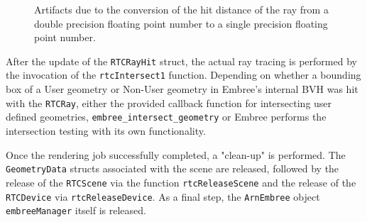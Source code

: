 \begin{figure}[!tbp]
	\centering
	\hfil
	\caption{Artifacts due to the conversion of the hit distance of the ray from a double precision floating point number to a single precision floating point number.}
	\label{fig:offset}
\end{figure}

After the update of the \texttt{RTCRayHit} struct, the actual ray tracing is performed by the invocation of the \texttt{rtcIntersect1} function. Depending on whether a bounding box of a User geometry or Non-User geometry in Embree's internal BVH was hit with the \texttt{RTCRay}, either the provided callback function for intersecting user defined geometries, \texttt{embree\_intersect\_geometry} or Embree performs the intersection testing with its own functionality. 

Once the rendering job successfully completed, a "clean-up" is performed. The \texttt{GeometryData} structs associated with the scene are released, followed by the release of the \texttt{RTCScene} via the function \texttt{rtcReleaseScene} and the release of the \texttt{RTCDevice} via \texttt{rtcReleaseDevice}. As a final step, the \texttt{ArnEmbree} object \texttt{embreeManager} itself is released.


